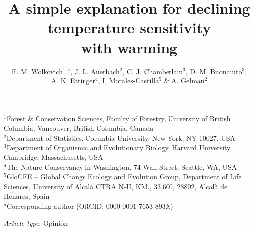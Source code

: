 \documentclass[11pt,letter]{article}
\begin{document}
\title{A simple explanation for declining temperature sensitivity \\ with warming} %
\author{E. M. Wolkovich$^{1,a}$,  J. L. Auerbach$^{2}$, C. J. Chamberlain$^{3}$, D. M. Buonaiuto$^{3}$, \\ A. K. Ettinger$^4$, I. Morales-Castilla$^{5}$ \& A. Gelman$^{2}$} 
\date{} %
\maketitle
$^1$Forest \& Conservation Sciences, Faculty of Forestry, University of British Columbia, Vancouver, British Columbia, Canada\\
$^2$Department of Statistics, Columbia University, New York, NY 10027, USA\\
$^3$Department of Organismic and Evolutionary Biology, Harvard University, Cambridge, Massachusetts, USA\\
$^4$The Nature Conservancy in Washington, 74 Wall Street, Seattle, WA, USA\\
$^5$GloCEE -- Global Change Ecology and Evolution Group, Department of Life Sciences, University of Alcal\`a CTRA N-II, KM., 33,600, 28802, Alcal\`a de Henares, Spain\\
$^a$Corresponding author (ORCID: 0000-0001-7653-893X)
\vspace{3ex}

\emph{Article type}: Opinion\\

\end{document}
